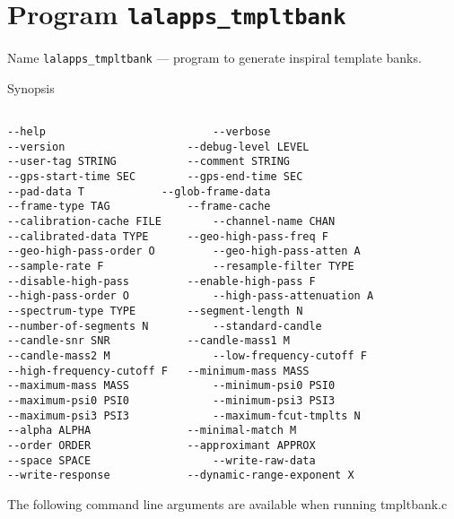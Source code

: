 \section{Program \texttt{lalapps\_tmpltbank}}
\label{program:lalapps-tmpltbank}

\begin{entry}
\item[Name]
\verb$lalapps_tmpltbank$ --- program to generate inspiral template banks.

\item[Synopsis]
\begin{verbatim}

--help                       	--verbose                   
--version                 	--debug-level LEVEL      
--user-tag STRING       	--comment STRING       
--gps-start-time SEC  		--gps-end-time SEC  
--pad-data T     		--glob-frame-data         
--frame-type TAG         	--frame-cache          
--calibration-cache FILE     	--channel-name CHAN          
--calibrated-data TYPE     	--geo-high-pass-freq F   
--geo-high-pass-order O      	--geo-high-pass-atten A  
--sample-rate F              	--resample-filter TYPE      	
--disable-high-pass       	--enable-high-pass F         
--high-pass-order O          	--high-pass-attenuation A   
--spectrum-type TYPE       	--segment-length N      
--number-of-segments N       	--standard-candle           
--candle-snr SNR           	--candle-mass1 M             
--candle-mass2 M            	--low-frequency-cutoff F     
--high-frequency-cutoff F  	--minimum-mass MASS        
--maximum-mass MASS          	--minimum-psi0 PSI0          
--maximum-psi0 PSI0          	--minimum-psi3 PSI3          
--maximum-psi3 PSI3         	--maximum-fcut-tmplts N    
--alpha ALPHA             	--minimal-match M       
--order ORDER          		--approximant APPROX          
--space SPACE                	--write-raw-data           
--write-response           	--dynamic-range-exponent X  

\end{verbatim}
\end{entry}
The following command line arguments are available when running tmpltbank.c
